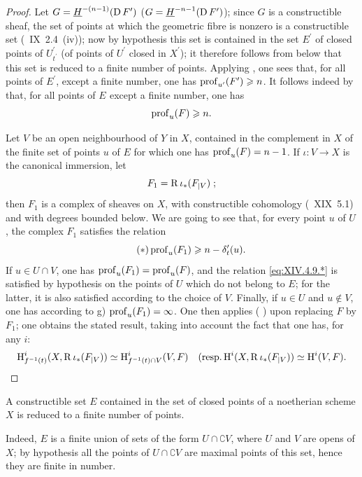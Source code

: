 \begin{proof}
Let $G=\underline{H}^{-(n-1)}(\operatorname{D} F^{\prime})$ (\resp $G=\underline{H}^{-n-1}(\operatorname{D} F^{\prime})$); since $G$ is a constructible sheaf, the set of points at which the geometric fibre is nonzero is a constructible set (~IX~2.4~\textup{(iv)}); now by hypothesis this set is contained in the set $E^{\prime}$ of closed points of $U_{t^{\prime}}^{\prime}$ (\resp of points of $U^{\prime}$ closed in $X^{\prime}$); it therefore follows from  below that this set is reduced to a finite number of points. Applying , one sees that, for all points of $E^{\prime}$, except a finite number, one has $\operatorname{prof}_{u^{\prime}}(F^{\prime})\geqslant n$. It follows indeed by  that, for all points of $E^{}$ except a finite number, one has
$$
\operatorname{prof}_{u}(F)\geqslant n.
$$

Let $V$ be an open neighbourhood of $Y$ in $X$, contained in the complement in $X$ of the finite set of points $u$ of $E$ for which one has $\operatorname{prof}_{u}(F)=n-1$. If $\iota\colon V\to X$ is the canonical immersion, let
$$F_{1}=\operatorname{R} \iota_{\ast}(F_{|V})\;;$$
then $F_{1}$ is a complex of sheaves on $X$, with constructible cohomology (~XIX~5.1) and with degrees bounded below. We are going to see that, for every point $u$ of $U$, the complex $F_{1}$ satisfies the relation
\begin{equation*} \label{eq:XIV.4.9.*} \tag{$*$}
\operatorname{prof}_{u}(F_{1})\geqslant n-\delta_{t}^{\prime}(u).
\end{equation*}
If $u\in U\cap V$, one has $\operatorname{prof}_{u}(F_{1})=\operatorname{prof}_{u}(F)$, and the
relation \eqref{eq:XIV.4.9.*} is satisfied by hypothesis on the
points of $U$ which do not belong to $E$; for the latter,
it is also satisfied according to the choice of $V$. Finally, if $u\in
U$ and $u\not\in V$, one has according to  g)
$\operatorname{prof}_{u}(F_{1})=\infty$. One then applies  (\resp
{}) upon replacing $F$ by $F_{1}$; one obtains the
stated result, taking into account the fact that one has, for any
$i$:
$$
\operatorname{H}_{f^{-1}(t)}^{i}(X, \operatorname{R} \iota_{\ast}(F_{|V}))\simeq\operatorname{H}_{f^{-1}(t)\cap V}^{i}(V, F)\quad(\textrm{resp.}\operatorname{H}^{i}(X, \operatorname{R} \iota_{\ast}(F_{|V}))\simeq\operatorname{H}^{i}(V, F).
$$
\skipqed
\end{proof}

\begin{sublemma} \label{XIV.4.9.1} A constructible set $E$ contained in the set of closed points of a noetherian scheme $X$ is reduced to a finite number of points.
\end{sublemma}

Indeed, $E$ is a finite union of sets of the form $U\cap\complement V$, where $U$ and $V$ are opens of $X$; by hypothesis all the points of $U\cap\complement V$ are maximal points of this set, hence they are finite in number.
